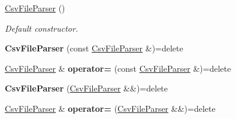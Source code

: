 \begin{DoxyCompactItemize}
\item 
\hyperlink{class_mdt_1_1_plain_text_1_1_csv_file_parser_ac7913634006a58b5a5c2b53a3de21a57}{Csv\+File\+Parser} ()
\begin{DoxyCompactList}\small\item\em Default constructor. \end{DoxyCompactList}\item 
{\bfseries Csv\+File\+Parser} (const \hyperlink{class_mdt_1_1_plain_text_1_1_csv_file_parser}{Csv\+File\+Parser} \&)=delete\hypertarget{class_mdt_1_1_plain_text_1_1_csv_file_parser_aae0320909fd8a5446eaa9fda14fa09f1}{}\label{class_mdt_1_1_plain_text_1_1_csv_file_parser_aae0320909fd8a5446eaa9fda14fa09f1}

\item 
\hyperlink{class_mdt_1_1_plain_text_1_1_csv_file_parser}{Csv\+File\+Parser} \& {\bfseries operator=} (const \hyperlink{class_mdt_1_1_plain_text_1_1_csv_file_parser}{Csv\+File\+Parser} \&)=delete\hypertarget{class_mdt_1_1_plain_text_1_1_csv_file_parser_a02a121fc249a42831a8b576730efac60}{}\label{class_mdt_1_1_plain_text_1_1_csv_file_parser_a02a121fc249a42831a8b576730efac60}

\item 
{\bfseries Csv\+File\+Parser} (\hyperlink{class_mdt_1_1_plain_text_1_1_csv_file_parser}{Csv\+File\+Parser} \&\&)=delete\hypertarget{class_mdt_1_1_plain_text_1_1_csv_file_parser_a469baced10f794d59e5571db255fc7df}{}\label{class_mdt_1_1_plain_text_1_1_csv_file_parser_a469baced10f794d59e5571db255fc7df}

\item 
\hyperlink{class_mdt_1_1_plain_text_1_1_csv_file_parser}{Csv\+File\+Parser} \& {\bfseries operator=} (\hyperlink{class_mdt_1_1_plain_text_1_1_csv_file_parser}{Csv\+File\+Parser} \&\&)=delete\hypertarget{class_mdt_1_1_plain_text_1_1_csv_file_parser_ab1a8da1371eedf4a21aaf1eccf412946}{}\label{class_mdt_1_1_plain_text_1_1_csv_file_parser_ab1a8da1371eedf4a21aaf1eccf412946}


\end{DoxyCompactItemize}
